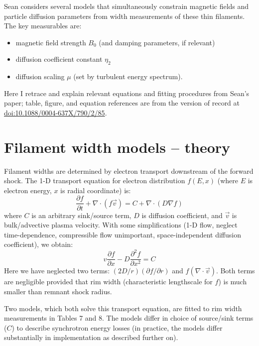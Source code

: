 \documentclass[10pt]{article}
\newcommand{\del}{\nabla}
\newcommand{\ptl}{\partial} %
\begin{document}
Sean considers several models that simultaneously constrain magnetic fields and
particle diffusion parameters from width measurements of these thin filaments.
The key measurables are:
\begin{itemize}
  \item magnetic field strength $B_0$ (and damping parameters, if relevant)
  \item diffusion coefficient constant $\eta_2$
  \item diffusion scaling $\mu$ (set by turbulent energy spectrum).
\end{itemize}

Here I retrace and explain relevant equations and fitting procedures from
Sean's paper; table, figure, and equation references are from the version of
record at \href{http://dx.doi.org/10.1088/0004-637X/790/2/85}
{doi:10.1088/0004-637X/790/2/85}.

\section{Filament width models -- theory}

Filament widths are determined by electron transport downstream of the forward
shock.  The 1-D transport equation for electron distribution $f(E,x)$
(where $E$ is electron energy, $x$ is radial coordinate) is:
\[
  \frac{\ptl f}{\ptl t} + \del \cdot \left( f \vec{v} \right)
  = C + \del \cdot \left( D \del f \right)
\]
where $C$ is an arbitrary sink/source term, $D$ is diffusion coefficient, and
$\vec{v}$ is bulk/advective plasma velocity.  With some simplifications
(1-D flow, neglect time-dependence, compressible flow unimportant,
space-independent diffusion coefficient), we obtain:
\[
    v \frac{\ptl f}{\ptl x} - D \frac{\ptl^2 f}{\ptl x^2} = C
\]
Here we have neglected two terms: $(2 D / r) (\ptl f /\ptl r)$ and
$f (\del\cdot\vec{v})$. Both terms are negligible provided that rim width
(characteristic lengthscale for $f$) is much smaller than remnant shock radius.

Two models, which both solve this transport equation, are fitted to rim width
measurements in Tables 7 and 8.  The models differ in choice of source/sink
terms ($C$) to describe synchrotron energy losses (in practice, the models
differ substantially in implementation as described further on).

\end{document}
